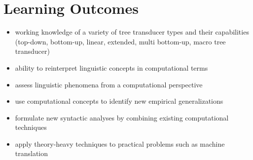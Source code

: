 \section{Learning Outcomes}
\begin{itemize}
    \item working knowledge of a variety of tree transducer types and their capabilities (top-down, bottom-up, linear, extended, multi bottom-up, macro tree transducer)
    \item ability to reinterpret linguistic concepts in computational terms
    \item assess linguistic phenomena from a computational perspective
    \item use computational concepts to identify new empirical generalizations
    \item formulate new syntactic analyses by combining existing computational techniques
    \item apply theory-heavy techniques to practical problems such as machine translation
\end{itemize}


